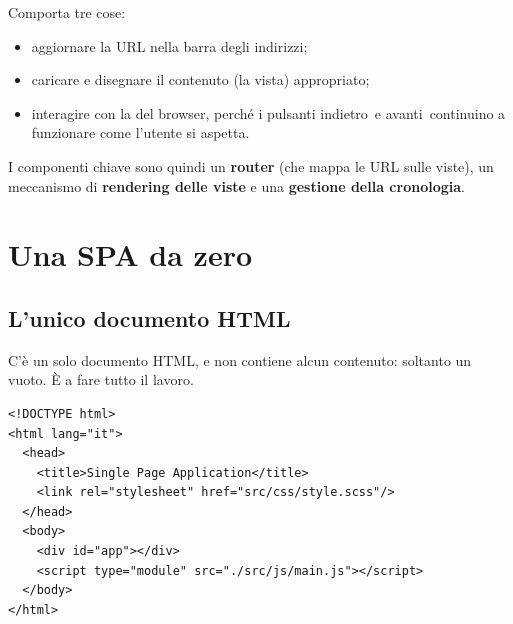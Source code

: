 Comporta tre cose:

\begin{itemize}
  \item aggiornare la URL nella barra degli indirizzi;
  \item caricare e disegnare il contenuto (la vista) appropriato;
  \item interagire con la  del browser, perché i pulsanti
        \guillemotleft indietro\guillemotright\ e \guillemotleft avanti\guillemotright\ continuino a funzionare come l'utente si
        aspetta.
\end{itemize}

I componenti chiave sono quindi un \textbf{router} (che mappa le URL sulle
viste), un meccanismo di \textbf{rendering delle viste} e una
\textbf{gestione della cronologia}.

\section{Una SPA da zero}

\subsection{L'unico documento HTML}

C'è un solo documento HTML, e non contiene alcun contenuto: soltanto un
 vuoto. È  a fare tutto il lavoro.

\begin{affianco}[0.5][c]
\codicepiccolo
\begin{lstlisting}[style=html, name=index.html]
<!DOCTYPE html>
<html lang="it">
  <head>
    <title>Single Page Application</title>
    <link rel="stylesheet" href="src/css/style.scss"/>
  </head>
  <body>
    <div id="app"></div>
    <script type="module" src="./src/js/main.js"></script>
  </body>
</html>
\end{lstlisting}
\risultato
\begin{immagine}
\end{immagine}
\end{affianco}

